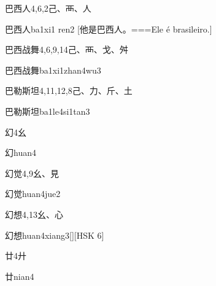 \begin{Entry}{巴西人}{4,6,2}{⼰、⾑、⼈}
  \begin{Phonetics}{巴西人}{ba1xi1 ren2}
    [他是巴西人。===Ele é brasileiro.]
  \end{Phonetics}
\end{Entry}

\begin{Entry}{巴西战舞}{4,6,9,14}{⼰、⾑、⼽、⾇}
  \begin{Phonetics}{巴西战舞}{ba1xi1zhan4wu3}
  \end{Phonetics}
\end{Entry}

\begin{Entry}{巴勒斯坦}{4,11,12,8}{⼰、⼒、⽄、⼟}
  \begin{Phonetics}{巴勒斯坦}{ba1le4si1tan3}
  \end{Phonetics}
\end{Entry}

\begin{Entry}{幻}{4}{⼳}
  \begin{Phonetics}{幻}{huan4}
  \end{Phonetics}
\end{Entry}

\begin{Entry}{幻觉}{4,9}{⼳、⾒}
  \begin{Phonetics}{幻觉}{huan4jue2}
  \end{Phonetics}
\end{Entry}

\begin{Entry}{幻想}{4,13}{⼳、⼼}
  \begin{Phonetics}{幻想}{huan4xiang3}[][HSK 6]
  \end{Phonetics}
\end{Entry}

\begin{Entry}{廿}{4}{⼶}
  \begin{Phonetics}{廿}{nian4}
  \end{Phonetics}
\end{Entry}

